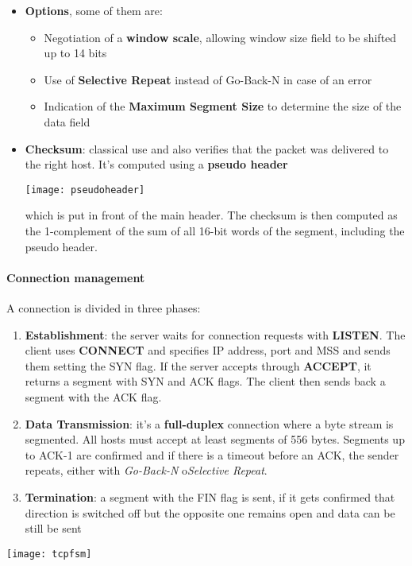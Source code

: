 \begin{itemize}
	\item \textbf{Options}, some of them are:
	\begin{itemize}
		\item Negotiation of a \textbf{window scale}, allowing window size field to be shifted up to 14 bits
		\item Use of \textbf{Selective Repeat} instead of Go-Back-N in case of an error
		\item Indication of the \textbf{Maximum Segment Size} to determine the size of the data field
	\end{itemize}
	\item \textbf{Checksum}: classical use and also verifies that the packet was delivered to the right host. It's computed using a \textbf{pseudo header}
	\begin{center}
		\texttt{[image: pseudoheader]}
	\end{center}
	which is put in front of the main header. The checksum is then computed as the 1-complement of the sum of all 16-bit words of the segment, including the pseudo header.
\end{itemize}

\paragraph{Connection management} A connection is divided in three phases:
\begin{enumerate}
	\item \textbf{Establishment}: the server waits for connection requests with \textbf{LISTEN}. The client uses \textbf{CONNECT} and specifies IP address, port and MSS and sends them setting the SYN flag. If the server accepts through \textbf{ACCEPT}, it returns a segment with SYN and ACK flags. The client then sends back a segment with the ACK flag.
	\item \textbf{Data Transmission}: it's a \textbf{full-duplex} connection where a byte stream is segmented. All hosts must accept at least segments of 556 bytes. Segments up to ACK-1 are confirmed and if there is a timeout before an ACK, the sender repeats, either with \textit{Go-Back-N} o\textit{Selective Repeat}.
	\item \textbf{Termination}: a segment with the FIN flag is sent, if it gets confirmed that direction is switched off but the opposite one remains open and data can be still be sent
\end{enumerate}
\begin{center}
	\texttt{[image: tcpfsm]}
\end{center}
